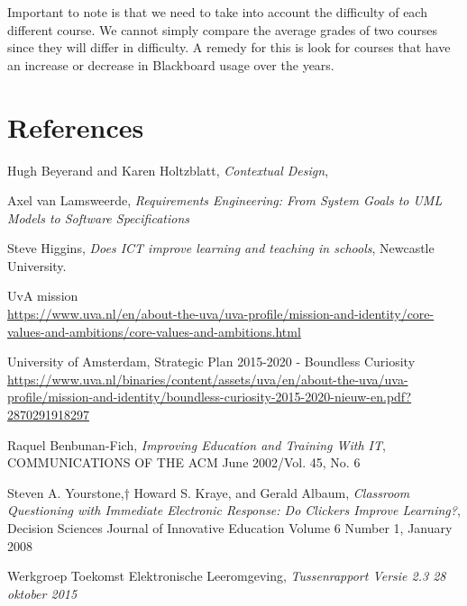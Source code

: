 Important to note is that we need to take into account the difficulty of each different course. We cannot simply compare the average grades of two courses since they will differ in difficulty. A remedy for this is look for courses that have an increase or decrease in Blackboard usage over the years. 


\chapter{References}

\begin{thebibliography}{9}
	
	Hugh Beyerand and Karen Holtzblatt,
	\emph{Contextual Design},
	
	Axel van Lamsweerde,
	\emph{Requirements Engineering: From System Goals to UML Models to Software Specifications}
	
	Steve Higgins,
	\emph{Does ICT improve learning and teaching in schools},
	Newcastle University.
	
	UvA mission \\
	\url{https://www.uva.nl/en/about-the-uva/uva-profile/mission-and-identity/core-values-and-ambitions/core-values-and-ambitions.html}
	
	University of Amsterdam,
	Strategic Plan 2015-2020 - Boundless Curiosity \\
	\url{https://www.uva.nl/binaries/content/assets/uva/en/about-the-uva/uva-profile/mission-and-identity/boundless-curiosity-2015-2020-nieuw-en.pdf?2870291918297}
	
	Raquel Benbunan-Fich,
	\emph{Improving Education and Training With IT},
	COMMUNICATIONS OF THE ACM June 2002/Vol. 45, No. 6
	
	Steven A. Yourstone,† Howard S. Kraye, and Gerald Albaum,
	\emph{Classroom Questioning with Immediate Electronic Response: Do Clickers Improve Learning?},
	Decision Sciences Journal of Innovative Education Volume 6 Number 1,
	January 2008
	
	Werkgroep Toekomst Elektronische Leeromgeving,
	\emph{Tussenrapport Versie 2.3 28 oktober 2015}
	

	
\end{thebibliography}


\appendix



